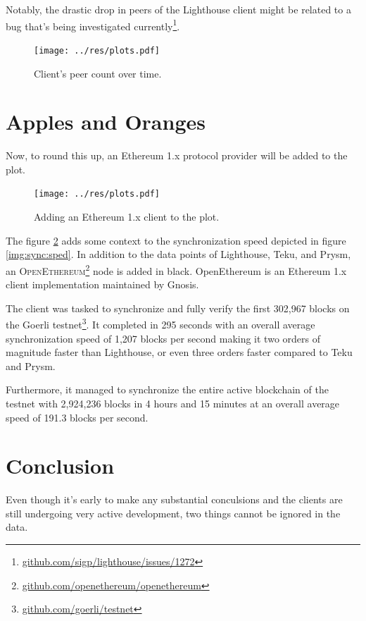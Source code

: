 \documentclass[twoside,twocolumn]{article}
\begin{document}
Notably, the drastic drop in peers of the Lighthouse client might be related to a bug that's being investigated currently\footnote{\href{https://github.com/sigp/lighthouse/issues/1272}{github.com/sigp/lighthouse/issues/1272}}.\par

\begin{figure}[t]
	\centering
	\texttt{[image: ../res/plots.pdf]}
	\caption{Client's peer count over time.}
	\label{img:per}
\end{figure}

\section{Apples and Oranges}
Now, to round this up, an Ethereum 1.x protocol provider will be added to the plot.\par

\begin{figure}[t]
	\centering
	\texttt{[image: ../res/plots.pdf]}
	\caption{Adding an Ethereum 1.x client to the plot.}
	\label{img:orange}
\end{figure}

The figure \ref{img:orange} adds some context to the synchronization speed depicted in figure \ref{img:sync:sped}. In addition to the data points of Lighthouse, Teku, and Prysm, an \textsc{OpenEthereum}\footnote{\href{https://github.com/openethereum/openethereum}{github.com/openethereum/openethereum}} node is added in black. OpenEthereum is an Ethereum 1.x client implementation maintained by Gnosis.\par

The client was tasked to synchronize and fully verify the first 302,967 blocks on the Goerli testnet\footnote{\href{https://github.com/goerli/testnet}{github.com/goerli/testnet}}. It completed in 295 seconds with an overall average synchronization speed of 1,207 blocks per second making it two orders of magnitude faster than Lighthouse, or even three orders faster compared to Teku and Prysm.\par

Furthermore, it managed to synchronize the entire active blockchain of the testnet with 2,924,236 blocks in 4 hours and 15 minutes at an overall average speed of 191.3 blocks per second.\par

\section{Conclusion}
Even though it's early to make any substantial conculsions and the clients are still undergoing very active development, two things cannot be ignored in the data.
\end{document}
